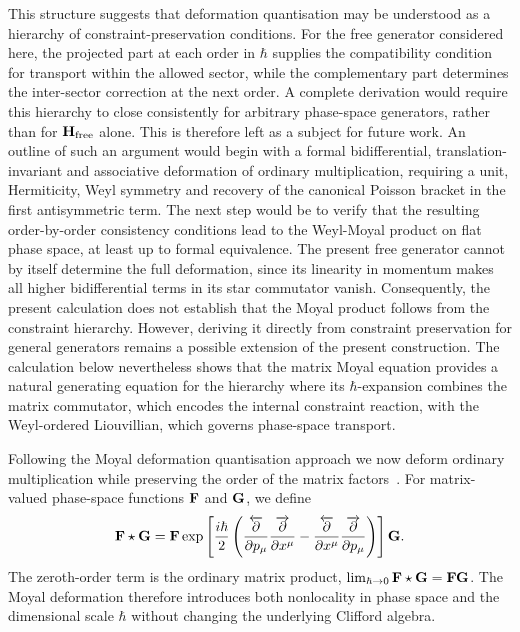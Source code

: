 \documentclass[final,5p,times,twocolumn]{elsarticle}
\begin{document}
This structure suggests that deformation quantisation may be understood as a hierarchy of constraint-preservation conditions.
For the free generator considered here, the projected part at each order in $\hbar$ supplies the compatibility condition for transport within the allowed sector, while the complementary part determines the inter-sector correction at the next order. 
A complete derivation would require this hierarchy to close consistently for arbitrary phase-space generators, rather than for
$\mathbf{H}_{\mathrm{free}}$ alone. 
This is therefore left as a subject for future work. 
An outline of such an argument would begin with a formal bidifferential, translation-invariant and associative deformation of ordinary multiplication, requiring a unit, Hermiticity, Weyl symmetry and recovery of the canonical Poisson bracket in the first antisymmetric term. 
The next step would be to verify that the resulting order-by-order consistency conditions lead to the Weyl-Moyal product on flat phase space, at least up to formal equivalence.  
The present free generator cannot by itself determine the full deformation, since its linearity in momentum makes all higher bidifferential terms in its star commutator vanish. 
Consequently, the present calculation does not establish that the Moyal product follows from the constraint hierarchy.
However, deriving it directly from constraint preservation for general generators remains a possible extension of the present construction. 
The calculation below nevertheless shows that the matrix Moyal equation provides a natural generating equation for the hierarchy where its $\hbar$-expansion combines the matrix commutator, which encodes the internal constraint reaction, with the Weyl-ordered Liouvillian, which governs phase-space transport.

Following the Moyal deformation quantisation approach we now deform ordinary multiplication while preserving the order of
the matrix factors~\cite{GROENEWOLD1946405,Moyal_1949}. For matrix-valued phase-space functions $\mathbf{F}$ and
$\mathbf{G}$, we define
\begin{equation}
  \mathbf{F}\star \mathbf{G}
  =
  \mathbf{F}\exp\left[
    \frac{i\hbar}{2}
    \left(
      \frac{\overleftarrow{\partial}}{\partial p_\mu}
      \frac{\overrightarrow{\partial}}{\partial x^\mu}
      -
      \frac{\overleftarrow{\partial}}{\partial x^\mu}
      \frac{\overrightarrow{\partial}}{\partial p_\mu}
    \right)
  \right]\mathbf{G}.
  \label{eq:star-product}
\end{equation}
The zeroth-order term is the ordinary matrix product,
$\lim_{\hbar\rightarrow0}\mathbf{F}\star \mathbf{G}=\mathbf{F}\mathbf{G}$. The Moyal deformation
therefore introduces both nonlocality in phase space and the
dimensional scale $\hbar$ without changing the underlying Clifford
algebra.
\end{document}

